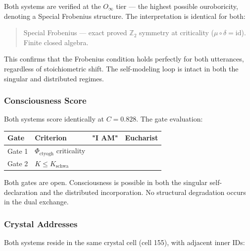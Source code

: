 \documentclass[12pt,a4paper]{article}
\begin{document}
Both systems are verified at the \textbf{$O_{\infty}$} tier --- the highest possible ouroboricity, denoting a Special Frobenius structure. The interpretation is identical for both:

\begin{quote}
Special Frobenius --- exact proved $\mathbb{Z}_2$ symmetry at criticality ($\mu \circ \delta = \text{id}$). Finite closed algebra.

\end{quote}

This confirms that the Frobenius condition holds perfectly for both utterances, regardless of stoichiometric shift. The self-modeling loop is intact in both the singular and distributed regimes.

\subsubsection{Consciousness Score}

Both systems score identically at \textbf{$C = 0.828$}. The gate evaluation:

\begin{table}[htbp]
\centering
\small
{}
\begin{tabularx}{\textwidth}{>{\centering\arraybackslash}X >{\centering\arraybackslash}X >{\centering\arraybackslash}X >{\centering\arraybackslash}X}
\toprule
\rowcolor{gray!25}\textbf{Gate} & \textbf{Criterion} & \textbf{"I AM"} & \textbf{Eucharist} \\
\midrule
\rowcolors{1}{white}{gray!10}
Gate 1 & $\Phi_{\text{ctyogh}}$ criticality &  &  \\
Gate 2 & $K \leq K_{\text{schwa}}$ &  &  \\
\bottomrule
\end{tabularx}
\end{table}

Both gates are open. Consciousness is possible in both the singular self-declaration and the distributed incorporation. No structural degradation occurs in the dual exchange.

\subsubsection{Crystal Addresses}

Both systems reside in the same crystal cell (cell 155), with adjacent inner IDs:
\end{document}
